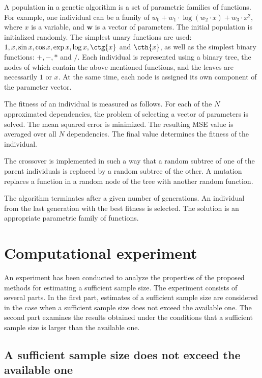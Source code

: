 \documentclass[
11pt,%
tightenlines,%
twoside,%
onecolumn,%
nofloats,%
nobibnotes,%
nofootinbib,%
superscriptaddress,%
noshowpacs,%
centertags]%
{revtex4-2}
\begin{document}
A population in a genetic algorithm is a set of parametric families of functions.
For example, one individual can be a family of $w_0 + w_1\cdot\log(w_2\cdot x) + w_3\cdot x^2$, where $x$ is a variable, and $\mathbf{w}$ is a vector of parameters. The initial population is initialized randomly. The simplest unary functions are used: $1, x, \sin{x}, \cos{x}, \exp{x}, \log{x}, \ctg{x}$ and $\cth{x}$, as well as the simplest binary functions: $+, -, *$ and $/$. Each individual is represented using a binary tree, the nodes of which contain the above-mentioned functions, and the leaves are necessarily $1$ or $x$. At the same time, each node is assigned its own component of the parameter vector.

The fitness of an individual is measured as follows. For each of the $N$ approximated dependencies, the problem of selecting a vector of parameters is solved. The mean squared error is minimized. The resulting MSE value is averaged over all $N$ dependencies. The final value determines the fitness of the individual.

The crossover is implemented in such a way that a random subtree of one of the parent individuals is replaced by a random subtree of the other. A mutation replaces a function in a random node of the tree with another random function. 

The algorithm terminates after a given number of generations. An individual from the last generation with the best fitness is selected. The solution is an appropriate parametric family of functions.

\section{Computational experiment}\label{sec4}

An experiment has been conducted to analyze the properties of the proposed methods for estimating a sufficient sample size. The experiment consists of several parts. In the first part, estimates of a sufficient sample size are considered in the case when a sufficient sample size does not exceed the available one. The second part examines the results obtained under the conditions that a sufficient sample size is larger than the available one.

\subsection{A sufficient sample size does not exceed the available one}
\end{document}
